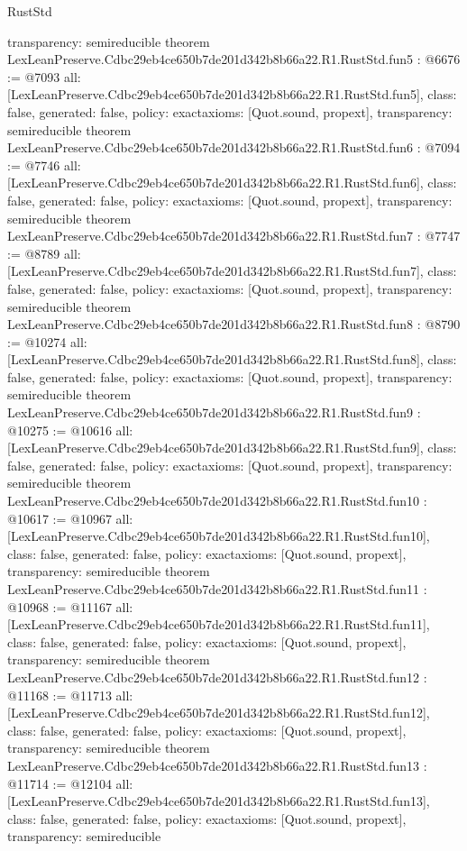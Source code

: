 \begin{lexlean}{RustStd}
\begin{coremodule}
{  transparency: semireducible
}
theorem LexLeanPreserve.Cdbc29eb4ce650b7de201d342b8b66a22.R1.RustStd.fun5 : @6676 := @7093 {
  all: [LexLeanPreserve.Cdbc29eb4ce650b7de201d342b8b66a22.R1.RustStd.fun5],
  class: false,
  generated: false,
  policy: exact{axioms: [Quot.sound, propext]},
  transparency: semireducible
}
theorem LexLeanPreserve.Cdbc29eb4ce650b7de201d342b8b66a22.R1.RustStd.fun6 : @7094 := @7746 {
  all: [LexLeanPreserve.Cdbc29eb4ce650b7de201d342b8b66a22.R1.RustStd.fun6],
  class: false,
  generated: false,
  policy: exact{axioms: [Quot.sound, propext]},
  transparency: semireducible
}
theorem LexLeanPreserve.Cdbc29eb4ce650b7de201d342b8b66a22.R1.RustStd.fun7 : @7747 := @8789 {
  all: [LexLeanPreserve.Cdbc29eb4ce650b7de201d342b8b66a22.R1.RustStd.fun7],
  class: false,
  generated: false,
  policy: exact{axioms: [Quot.sound, propext]},
  transparency: semireducible
}
theorem LexLeanPreserve.Cdbc29eb4ce650b7de201d342b8b66a22.R1.RustStd.fun8 : @8790 := @10274 {
  all: [LexLeanPreserve.Cdbc29eb4ce650b7de201d342b8b66a22.R1.RustStd.fun8],
  class: false,
  generated: false,
  policy: exact{axioms: [Quot.sound, propext]},
  transparency: semireducible
}
theorem LexLeanPreserve.Cdbc29eb4ce650b7de201d342b8b66a22.R1.RustStd.fun9 : @10275 := @10616 {
  all: [LexLeanPreserve.Cdbc29eb4ce650b7de201d342b8b66a22.R1.RustStd.fun9],
  class: false,
  generated: false,
  policy: exact{axioms: [Quot.sound, propext]},
  transparency: semireducible
}
theorem LexLeanPreserve.Cdbc29eb4ce650b7de201d342b8b66a22.R1.RustStd.fun10 : @10617 := @10967 {
  all: [LexLeanPreserve.Cdbc29eb4ce650b7de201d342b8b66a22.R1.RustStd.fun10],
  class: false,
  generated: false,
  policy: exact{axioms: [Quot.sound, propext]},
  transparency: semireducible
}
theorem LexLeanPreserve.Cdbc29eb4ce650b7de201d342b8b66a22.R1.RustStd.fun11 : @10968 := @11167 {
  all: [LexLeanPreserve.Cdbc29eb4ce650b7de201d342b8b66a22.R1.RustStd.fun11],
  class: false,
  generated: false,
  policy: exact{axioms: [Quot.sound, propext]},
  transparency: semireducible
}
theorem LexLeanPreserve.Cdbc29eb4ce650b7de201d342b8b66a22.R1.RustStd.fun12 : @11168 := @11713 {
  all: [LexLeanPreserve.Cdbc29eb4ce650b7de201d342b8b66a22.R1.RustStd.fun12],
  class: false,
  generated: false,
  policy: exact{axioms: [Quot.sound, propext]},
  transparency: semireducible
}
theorem LexLeanPreserve.Cdbc29eb4ce650b7de201d342b8b66a22.R1.RustStd.fun13 : @11714 := @12104 {
  all: [LexLeanPreserve.Cdbc29eb4ce650b7de201d342b8b66a22.R1.RustStd.fun13],
  class: false,
  generated: false,
  policy: exact{axioms: [Quot.sound, propext]},
  transparency: semireducible
}
\end{coremodule}
\end{lexlean}
